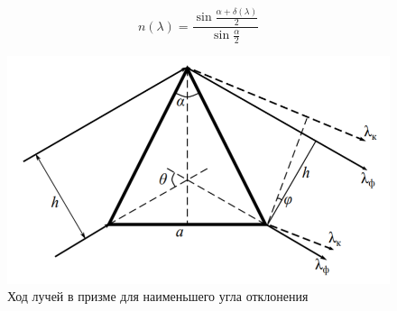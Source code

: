 \documentclass[a4paper, 12pt]{article}%
\begin{document}
\[n(\lambda) = \frac{\sin \frac{\alpha + \delta (\lambda )}{2}}{\sin \frac{\alpha}{2}}\]

\begin{figure}[h!]
\centering
\includegraphics[scale=0.5]{images/teor_1.png}
\caption{Ход лучей в призме для наименьшего угла отклонения}
\label{fig:teor_1}
\end{figure}
\end{document}
